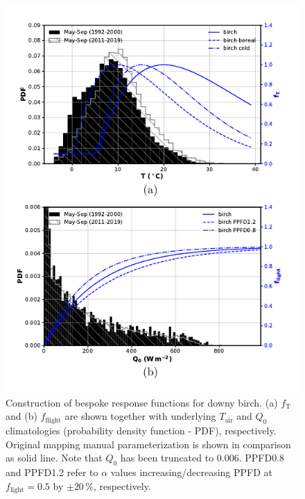 \documentclass[bg, manuscript]{copernicus}
\begin{document}
\begin{figure}[t]
  \includegraphics[width=12cm]{figB3}
\caption{Construction of bespoke response functions for downy birch. (a) $f_\mathrm{T}$ and (b) $f_\mathrm{flight}$ are shown together with underlying $T_\mathrm{air}$ and $Q_0$ climatologies (probability density function - PDF), respectively. Original mapping manual parameterization is shown in comparison as solid line. Note that $Q_0$ has been truncated to $0.006$. PPFD0.8 and PPFD1.2 refer to $\alpha$ values increasing/decreasing PPFD at $f_\mathrm{light}=0.5$ by $\pm 20\,\%$, respectively.}
\label{fig:f_temp_birch}
\end{figure}
\end{document}
